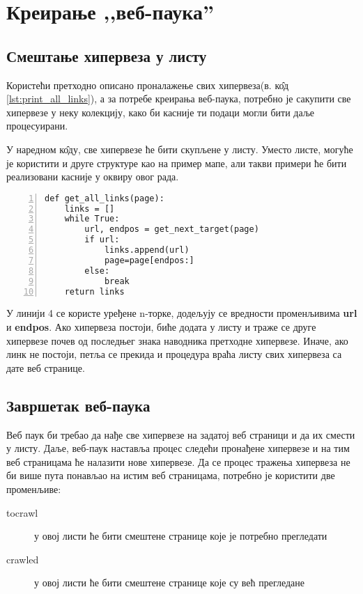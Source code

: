 \section{Креирање ,,веб-паука''}

\subsection{Смештање хипервеза у листу}

Користећи претходно описано проналажење свих хипервеза(в. к\^{о}д \ref{lst:print_all_links}), а за потребе креирања веб-паука, потребно је сакупити све хипервезе у неку колекцију, како би касније ти подаци могли бити даље процесуирани.

У наредном к\^{о}ду, све хипервезе ће бити скупљене у листу. Уместо листе, могуће је користити и друге структуре као на пример мапе, али такви примери ће бити реализовани касније у оквиру овог рада.

\begin{lstlisting}[caption=Процедура смештања свих хиперлинкова у листу, label={lst:getalllinks}, numbers=left]
def get_all_links(page):
    links = []
    while True:
        url, endpos = get_next_target(page)
        if url:
            links.append(url)
            page=page[endpos:]
        else:
            break
    return links
\end{lstlisting}

У линији 4 се користе уређене n-торке, додељују се вредности променљивима \textbf{url} и \textbf{endpos}. Ако хипервеза постоји, биће додата у листу и траже се друге хипервезе почев од последњег знака наводника претходне хипервезе. Иначе, ако линк не постоји, петља се прекида и процедура враћа листу свих хипервеза са дате веб странице.

\subsection{Завршетак веб-паука}

Веб паук би требао да нађе све хипервезе на задатој веб страници и да их смести
у листу. Даље, веб-паук наставља процес следећи пронађене хипервезе и на тим веб
страницама ће налазити нове хипервезе. Да се процес тражења хипервеза не би више
пута понављао на истим веб страницама, потребно је користити две променљиве:

\begin{description}
\item[tocrawl] у овој листи ће бити смештене странице које је потребно прегледати
\item[crawled] у овој листи ће бити смештене странице које су већ прегледане
\end{description}


